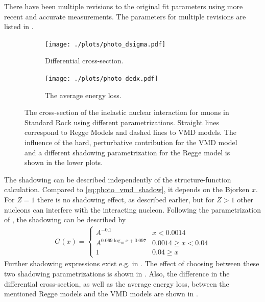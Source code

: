 There have been multiple revisions \cite{Abramowicz97, Abt17PhotoQ2} to the original fit parameters using more recent and accurate measurements.
The parameters for multiple revisions are listed in .
\begin{figure}
    \centering
    \begin{subfigure}{0.9\textwidth}
        \centering
        \texttt{[image: ./plots/photo\_dsigma.pdf]}
        \caption{Differential cross-section.}
        \label{fig:photo_dsigma}
        \vspace{0.5cm}
    \end{subfigure}
    \begin{subfigure}{0.9\textwidth}
        \centering
        \texttt{[image: ./plots/photo\_dedx.pdf]}
        \caption{The average energy loss.}
        \label{fig:photo_dedx_compare}
    \end{subfigure}
    \caption{The cross-section of the inelastic nuclear interaction for muons in Standard Rock using different parametrizations. Straight lines correspond to Regge Models and dashed lines to VMD models. The influence of the hard, perturbative contribution for the VMD model and a different shadowing parametrization for the Regge model is shown in the lower plots.}
    \label{fig:photo_xsection_compare}
\end{figure}

The shadowing can be described independently of the structure-function calculation.
Compared to \eqref{eq:photo_vmd_shadow}, it depends on the Bjorken $x$.
For $Z=1$ there is no shadowing effect, as described earlier, but for $Z>1$ other nucleons can interfere with the interacting nucleon.
Following the parametrization of \cite{Dutta01}, the shadowing can be described by
\begin{align}
    G(x) = \begin{cases}
        A^{-0.1} & x < 0.0014 \\
        A^{0.069 \log_10 x + 0.097} & 0.0014 \geq x < 0.04 \\
        1 & 0.04 \geq x
        \end{cases}
\end{align}
Further shadowing expressions exist e.g. in \cite{Butkevich02}.
The effect of choosing between these two shadowing parametrizations is shown in .
Also, the difference in the differential cross-section, as well as the average energy loss, between the mentioned Regge models and the VMD models are shown in .

